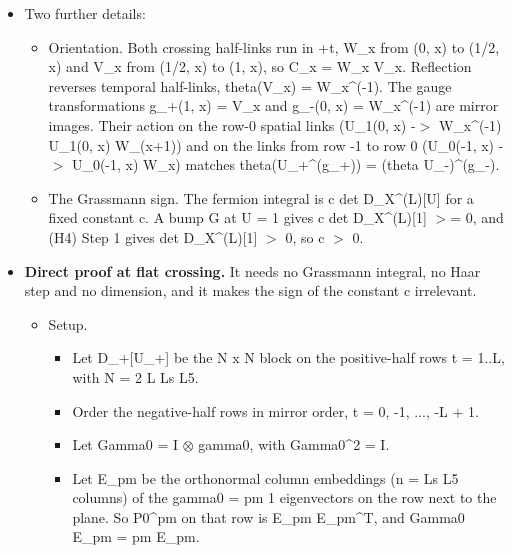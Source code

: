\documentclass[11pt,a4paper]{article}
\begin{document}
\begin{itemize}
\item{} Two further details:
\begin{itemize}
\item{} Orientation. Both crossing half-links run in +t, W\_x from (0, x) to (1/2, x) and V\_x from (1/2, x) to (1, x),
so C\_x = W\_x V\_x. Reflection reverses temporal half-links, theta(V\_x) = W\_x\textasciicircum{}(-1). The gauge transformations
g\_+(1, x) = V\_x and g\_-(0, x) = W\_x\textasciicircum{}(-1) are mirror images. Their action on the row-0 spatial links
(U\_1(0, x) -$>$ W\_x\textasciicircum{}(-1) U\_1(0, x) W\_(x+1)) and on the links from row -1 to row 0 (U\_0(-1, x) -$>$ U\_0(-1, x) W\_x)
matches theta(U\_+\textasciicircum{}(g\_+)) = (theta U\_-)\textasciicircum{}(g\_-).
\item{} The Grassmann sign. The fermion integral is c det D\_X\textasciicircum{}(L)[U] for a fixed constant c. A bump G at U = 1 gives
c det D\_X\textasciicircum{}(L)[1] $>$= 0, and (H4) Step 1 gives det D\_X\textasciicircum{}(L)[1] $>$ 0, so c $>$ 0.
\end{itemize}

\item{} {\bfseries\boldmath Direct proof at flat crossing.} It needs no
Grassmann integral, no Haar step and no dimension, and it makes the sign of the constant c irrelevant.
\begin{itemize}
\item{} Setup.
\begin{itemize}
\item{} Let D\_+[U\_+] be the N x N block on the positive-half rows t = 1..L, with N = 2 L Ls L5.
\item{} Order the negative-half rows in mirror order, t = 0, -1, ..., -L + 1.
\item{} Let Gamma0 = I $\otimes$ gamma0, with Gamma0\textasciicircum{}2 = I.
\item{} Let E\_pm be the orthonormal column embeddings (n = Ls L5 columns) of the gamma0 = pm 1 eigenvectors on the row
next to the plane. So P0\textasciicircum{}pm on that row is E\_pm E\_pm\textasciicircum{}T, and Gamma0 E\_pm = pm E\_pm.
\end{itemize}


\end{itemize}
\end{itemize}
\end{document}
